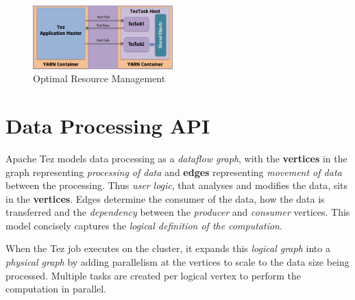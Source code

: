 \documentclass[twocolumn]{article}
\begin{document}
\begin{figure}[htb]
        \centering
        \includegraphics[width=0.48\textwidth]{tez4}
        \caption{Optimal Resource Management}
        \label{fig06}
\end{figure}





\section{Data Processing API}

Apache Tez models data processing as a \emph{dataflow graph}, with the
\textbf{vertices} in the graph representing \emph{processing of data}
and \textbf{edges} representing \emph{movement of data} between the
processing. Thus \emph{user logic}, that analyses and modifies the data,
sits in the \textbf{vertices}. Edges determine the consumer of the data,
how the data is transferred and the \emph{dependency} between the
\emph{producer} and \emph{consumer} vertices. This model concisely
captures the \emph{logical definition of the computation}. 

When the Tez
job executes on the cluster, it expands this \emph{logical graph} into a
\emph{physical graph} by adding parallelism at the vertices to scale to
the data size being processed. Multiple tasks are created per logical
vertex to perform the computation in parallel.
\end{document}

